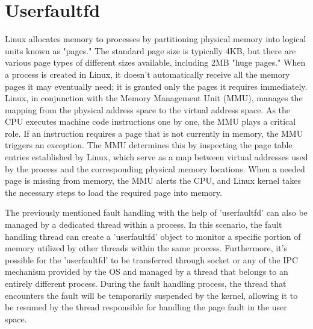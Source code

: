 \documentclass[article, doublespace,nopageskip]{VTthesis} %
\begin{document}
     \section{Userfaultfd} \label{ss:Userfaultfd}
     Linux allocates memory to processes by partitioning physical memory into logical units known as "pages." The standard page size is typically 4KB, but there are various page types of different sizes available, including 2MB "huge pages." When a process is created in Linux, it doesn't automatically receive all the memory pages it may eventually need; it is granted only the pages it requires immediately. Linux, in conjunction with the Memory Management Unit (MMU), manages the mapping from the physical address space to the virtual address space. As the CPU executes machine code instructions one by one, the MMU plays a critical role. If an instruction requires a page that is not currently in memory, the MMU triggers an exception. The MMU determines this by inspecting the page table entries established by Linux, which serve as a map between virtual addresses used by the process and the corresponding physical memory locations. When a needed page is missing from memory, the MMU alerts the CPU, and Linux kernel takes the necessary steps to load the required page into memory.

     The previously mentioned fault handling with the help of 'userfaultfd' \cite{userfaultfd} can also be managed by a dedicated thread within a process. In this scenario, the fault handling thread can create a 'userfaultfd' object to monitor a specific portion of memory utilized by other threads within the same process. Furthermore, it's possible for the 'userfaultfd' to be transferred through socket or any of the IPC mechanism provided by the OS and managed by a thread that belongs to an entirely different process. During the fault handling process, the thread that encounters the fault will be temporarily suspended by the kernel, allowing it to be resumed by the thread responsible for handling the page fault in the user space.
     
    
\end{document}
